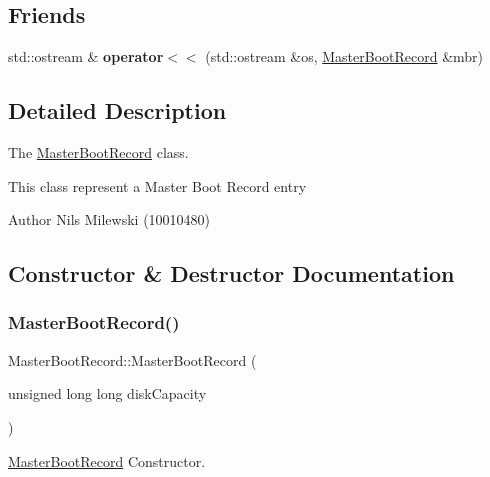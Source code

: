 \subsection*{Friends}
\begin{DoxyCompactItemize}
\item 
\mbox{\label{classdisk_1_1_master_boot_record_a33e3ea037895ea6142548552beee358a}} 
std\+::ostream \& {\bfseries operator$<$$<$} (std\+::ostream \&os, \mbox{\hyperlink{classdisk_1_1_master_boot_record}{Master\+Boot\+Record}} \&mbr)
\end{DoxyCompactItemize}


\subsection{Detailed Description}
The \mbox{\hyperlink{classdisk_1_1_master_boot_record}{Master\+Boot\+Record}} class. 

This class represent a Master Boot Record entry \begin{DoxyAuthor}{Author}
Nils Milewski (10010480) 
\end{DoxyAuthor}


\subsection{Constructor \& Destructor Documentation}
\mbox{\label{classdisk_1_1_master_boot_record_ad037f4c38e76f64b7d06f8795531442c}} 
\subsubsection{\texorpdfstring{Master\+Boot\+Record()}{MasterBootRecord()}}
{\footnotesize\ttfamily Master\+Boot\+Record\+::\+Master\+Boot\+Record (\begin{DoxyParamCaption}\item[{unsigned long long}]{disk\+Capacity }\end{DoxyParamCaption})}



\mbox{\hyperlink{classdisk_1_1_master_boot_record}{Master\+Boot\+Record}} Constructor. 

